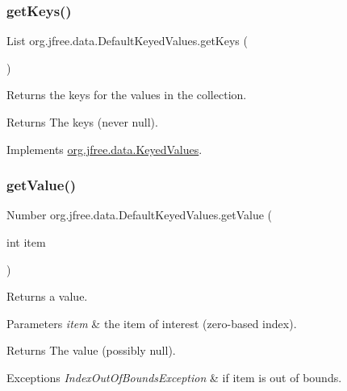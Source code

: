 \subsubsection{\texorpdfstring{get\+Keys()}{getKeys()}}
{\footnotesize\ttfamily List org.\+jfree.\+data.\+Default\+Keyed\+Values.\+get\+Keys (\begin{DoxyParamCaption}{ }\end{DoxyParamCaption})}

Returns the keys for the values in the collection.

\begin{DoxyReturn}{Returns}
The keys (never {\ttfamily null}). 
\end{DoxyReturn}


Implements \mbox{\hyperlink{interfaceorg_1_1jfree_1_1data_1_1_keyed_values_a5bc1316f3c71eeaa6e38effe4ea660d5}{org.\+jfree.\+data.\+Keyed\+Values}}.

\mbox{\label{classorg_1_1jfree_1_1data_1_1_default_keyed_values_a38fcea7e618e557e028940a48ffc61f0}} 
\subsubsection{\texorpdfstring{get\+Value()}{getValue()}\hspace{0.1cm}{\footnotesize\ttfamily [1/2]}}
{\footnotesize\ttfamily Number org.\+jfree.\+data.\+Default\+Keyed\+Values.\+get\+Value (\begin{DoxyParamCaption}\item[{int}]{item }\end{DoxyParamCaption})}

Returns a value.


\begin{DoxyParams}{Parameters}
{\em item} & the item of interest (zero-\/based index).\\
\hline
\end{DoxyParams}
\begin{DoxyReturn}{Returns}
The value (possibly {\ttfamily null}).
\end{DoxyReturn}

\begin{DoxyExceptions}{Exceptions}
{\em Index\+Out\+Of\+Bounds\+Exception} & if {\ttfamily item} is out of bounds. \\
\hline
\end{DoxyExceptions}


